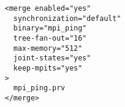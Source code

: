 \begin{verbatim}
<merge enabled="yes" 
  synchronization="default"
  binary="mpi_ping"
  tree-fan-out="16"
  max-memory="512"
  joint-states="yes"
  keep-mpits="yes"
>
  mpi_ping.prv 
</merge>
\end{verbatim}
